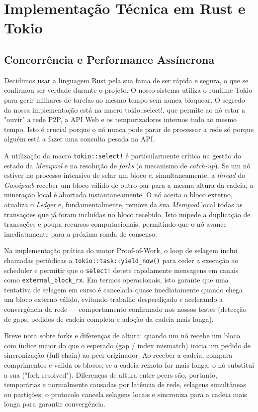 \documentclass[11pt]{article}
\begin{document}
\section{Implementação Técnica em Rust e Tokio}

\subsection{Concorrência e Performance Assíncrona}
Decidimos usar a linguagem Rust pela sua fama de ser rápida e segura, o que se confirmou ser verdade durante o projeto. O nosso sistema utiliza o runtime Tokio para gerir milhares de tarefas ao mesmo tempo sem nunca bloquear. O segredo da nossa implementação está na macro tokio::select!, que permite ao nó estar a "ouvir" a rede P2P, a API Web e os temporizadores internos tudo ao mesmo tempo. Isto é crucial porque o nó nunca pode parar de processar a rede só porque alguém está a fazer uma consulta pesada na API.

    A utilização da macro \texttt{tokio::select!} é particularmente crítica na gestão do estado da \textit{Mempool} e na resolução de \textit{forks} (o mecanismo de \textit{catch-up}). Se um nó estiver no processo intensivo de selar um bloco e, simultaneamente, a \textit{thread} do \textit{Gossipsub} receber um bloco válido de outro par para a mesma altura da cadeia, a mineração local é abortada instantaneamente. O nó aceita o bloco externo, atualiza o \textit{Ledger} e, fundamentalmente, remove da sua \textit{Mempool} local todas as transações que já foram incluídas no bloco recebido. Isto impede a duplicação de transações e poupa recursos computacionais, permitindo que o nó avance imediatamente para a próxima ronda de consenso.

    Na implementação prática do motor Proof-of-Work, o loop de selagem inclui chamadas periódicas a \texttt{tokio::task::yield\_now()} para ceder a execução ao scheduler e permitir que o \texttt{select!} detete rapidamente mensagens em canais como \texttt{external\_block\_rx}. Em termos operacionais, isto garante que uma tentativa de selagem em curso é cancelada quase imediatamente quando chega um bloco externo válido, evitando trabalho desperdiçado e acelerando a convergência da rede — comportamento confirmado nos nossos testes (detecção de gaps, pedidos de cadeia completa e adoção da cadeia mais longa).

    Breve nota sobre forks e diferenças de altura: quando um nó recebe um bloco com índice maior do que o esperado (gap / index mismatch) inicia um pedido de sincronização (full chain) ao peer originador. Ao receber a cadeia, compara comprimentos e valida os blocos; se a cadeia remota for mais longa, o nó substitui a sua ("fork resolved"). Diferenças de altura entre peers são, portanto, temporárias e normalmente causadas por latência de rede, selagens simultâneas ou partições; o protocolo cancela selagens locais e sincroniza para a cadeia mais longa para garantir convergência.
\end{document}
